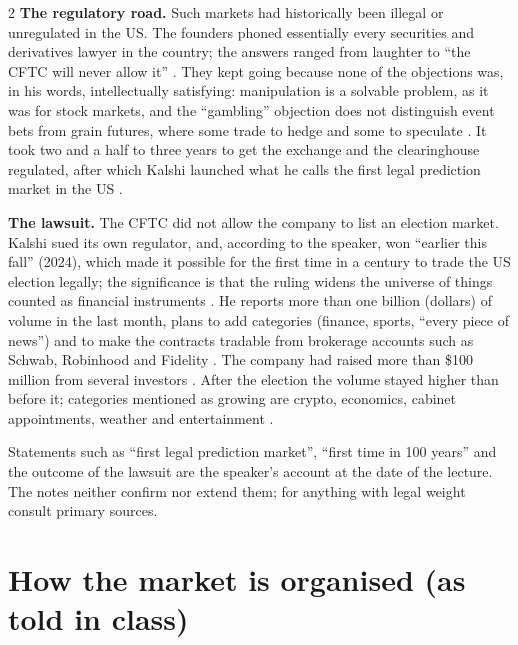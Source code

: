 \begin{paracol}{2}
\textbf{The regulatory road.} Such markets had historically been illegal or unregulated in the US. The
founders phoned essentially every securities and derivatives lawyer in the country; the answers ranged from
laughter to ``the CFTC will never allow it'' . They kept going
because none of the objections was, in his words, intellectually satisfying: manipulation is a solvable
problem, as it was for stock markets, and the ``gambling'' objection does not distinguish event bets from grain
futures, where some trade to hedge and some to speculate . It took two and a half to three years
to get the exchange and the clearinghouse regulated, after which Kalshi launched what he calls the first
legal prediction market in the US .

\textbf{The lawsuit.} The CFTC did not allow the company to list an election market. Kalshi sued its own
regulator, and, according to the speaker, won ``earlier this fall'' (2024), which made it possible for the
first time in a century to trade the US election legally; the significance is that the ruling widens the universe of
things counted as financial instruments . He reports more than one
billion (dollars) of volume in the last month, plans to add categories (finance, sports, ``every piece of
news'') and to make the contracts tradable from brokerage accounts such as Schwab, Robinhood and Fidelity
. The company had raised more than \$100 million from several investors
. After the election the volume stayed higher than before it; categories mentioned as growing are
crypto, economics, cabinet appointments, weather and entertainment .

\begin{coursenote}
Statements such as ``first legal prediction market'', ``first time in 100 years'' and the outcome of the
lawsuit are the speaker's account at the date of the lecture. The notes neither confirm nor extend them;
for anything with legal weight consult primary sources.
\end{coursenote}

\section{How the market is organised (as told in class)}\label{ch14:sec-market}


\end{paracol}
